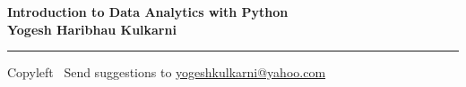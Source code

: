 
\graphicspath{{images/}}

\footnotesize


\begin{center}
\Large{\textbf{Introduction to Data Analytics with Python\\ Yogesh Haribhau Kulkarni}}  
\end{center}

\begin{multicols}{2}

\end{multicols}

\rule{\linewidth}{0.25pt}
\scriptsize
Copyleft \textcopyleft\  Send suggestions to 
\href{http://www.yogeshkulkarni.com}{yogeshkulkarni@yahoo.com}


